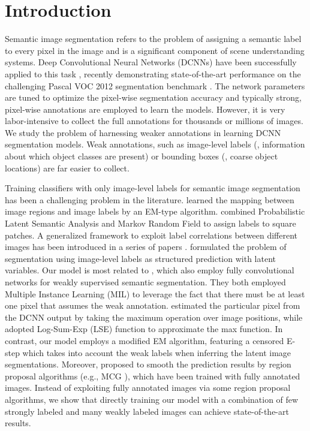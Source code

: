 \section{Introduction}
\label{sec:intro}

Semantic image segmentation refers to the problem of assigning a
semantic label to every pixel in the image and is a significant
component of scene understanding systems. Deep Convolutional Neural
Networks (DCNNs) have been successfully applied to this task
\citep{farabet2013learning, pinheiro2014recurrent,
  eigen2014predicting}, recently demonstrating state-of-the-art
performance on the challenging Pascal VOC 2012 segmentation benchmark
\citep{chen2014semantic, mostajabi2014feedforward,
  long2014fully}. The network parameters are tuned to
optimize the pixel-wise segmentation accuracy and typically strong,
pixel-wise annotations are employed to learn the models. However, it
is very labor-intensive to collect the full annotations for thousands
or millions of images. We study the problem of harnessing weaker
annotations in learning DCNN segmentation models. Weak annotations,
such as image-level labels (\ie, information about which object
classes are present) or bounding boxes (\ie, coarse object locations)
are far easier to collect. 

Training classifiers with only image-level labels for semantic image
segmentation has been a challenging problem in the
literature. \citet{duygulu2002object} learned the mapping between
image regions and image labels by an EM-type
algorithm. \citet{verbeek2007region} combined Probabilistic Latent
Semantic Analysis and Markov Random Field to assign labels to square
patches. A generalized framework to exploit label correlations between
different images has been introduced in a series of papers
\citep{vezhnevets2010towards, vezhnevets2011weakly,
  vezhnevets2012weakly}. \citet{xu2014tell} formulated the problem of
segmentation using image-level labels as structured prediction with
latent variables. Our model is most related to \citet{pathak2014fully,
  pinheiro2014weakly}, which also employ fully convolutional networks
for weakly supervised semantic segmentation. They both employed
Multiple Instance Learning (MIL) to leverage the fact that there must
be at least one pixel that assumes the weak
annotation. \citet{pathak2014fully} estimated the particular pixel
from the DCNN output by taking the maximum operation over image
positions, while \citet{pinheiro2014weakly} adopted Log-Sum-Exp (LSE)
function to approximate the max function. In contrast, our model
employs a modified EM algorithm, featuring a censored E-step which
takes into account the weak labels when inferring the latent image
segmentations. Moreover, \citet{pinheiro2014weakly} proposed to smooth
the prediction results by region proposal algorithms (e.g., MCG
\citep{arbelaez2014multiscale}), which have been trained with fully
annotated images. Instead of exploiting fully annotated images via
some region proposal algorithms, we show that directly training our
model with a combination of few strongly labeled and many weakly
labeled images can achieve state-of-the-art results.

